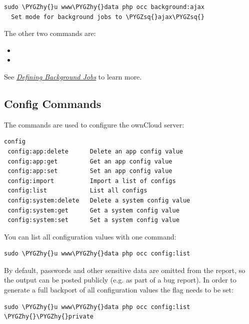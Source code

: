 \documentclass[letterpaper,10pt,english]{sphinxmanual}
\def\PYGZhy{\char`\-}
\def\PYGZsq{\char`\'}
\begin{document}
\begin{Verbatim}[commandchars=\\\{\}]
sudo \PYGZhy{}u www\PYGZhy{}data php occ background:ajax
  Set mode for background jobs to \PYGZsq{}ajax\PYGZsq{}
\end{Verbatim}

The other two commands are:
\begin{itemize}
\item {} 

\item {} 

\end{itemize}

See {\hyperref[configuration_server/background_jobs_configuration::doc]{\emph{Defining Background Jobs}}} to learn more.


\subsection{Config Commands}
\label{configuration_server/occ_command:config-commands-label}\label{configuration_server/occ_command:config-commands}
The  commands are used to configure the ownCloud server:

\begin{Verbatim}[commandchars=\\\{\}]
config
 config:app:delete      Delete an app config value
 config:app:get         Get an app config value
 config:app:set         Set an app config value
 config:import          Import a list of configs
 config:list            List all configs
 config:system:delete   Delete a system config value
 config:system:get      Get a system config value
 config:system:set      Set a system config value
\end{Verbatim}

You can list all configuration values with one command:

\begin{Verbatim}[commandchars=\\\{\}]
sudo \PYGZhy{}u www\PYGZhy{}data php occ config:list
\end{Verbatim}

By default, passwords and other sensitive data are omitted from the report, so
the output can be posted publicly (e.g. as part of a bug report). In order to
generate a full backport of all configuration values the  flag
needs to be set:

\begin{Verbatim}[commandchars=\\\{\}]
sudo \PYGZhy{}u www\PYGZhy{}data php occ config:list \PYGZhy{}\PYGZhy{}private
\end{Verbatim}
\end{document}

